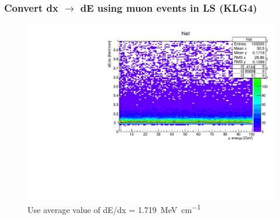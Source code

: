 \documentclass{beamer}
\begin{document}
\begin{frame}
	\frametitle{Convert dx $\to$ dE using muon events in LS (KLG4)}
	\begin{figure}
		\centering
		\includegraphics[width=\textwidth]{muStoppingPower_1to100GeV.pdf}
		\caption{
			Use average value of dE/dx =
			\SI{1.719}{\mega\electronvolt\per\centi\meter}
		}
	\end{figure}
\end{frame}
\end{document}
